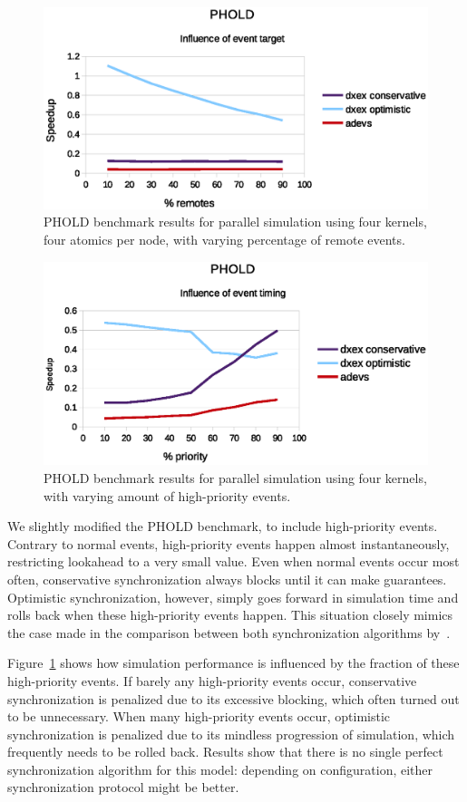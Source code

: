 \begin{figure}
    \center
    \includegraphics[width=\columnwidth]{fig/phold_remotes.eps}
    \caption{PHOLD benchmark results for parallel simulation using four kernels, four atomics per node, with varying percentage of remote events.}
\end{figure}
\begin{figure}
	\center
	\includegraphics[width=\columnwidth]{fig/phold_priority.eps}
	\caption{PHOLD benchmark results for parallel simulation using four kernels, with varying amount of high-priority events.}
	\label{fig:phold_priority}
\end{figure}

We slightly modified the PHOLD benchmark, to include high-priority events.
Contrary to normal events, high-priority events happen almost instantaneously, restricting lookahead to a very small value.
Even when normal events occur most often, conservative synchronization always blocks until it can make guarantees.
Optimistic synchronization, however, simply goes forward in simulation time and rolls back when these high-priority events happen.
This situation closely mimics the case made in the comparison between both synchronization algorithms by~\cite{FujimotoBook}.

Figure~\ref{fig:phold_priority} shows how simulation performance is influenced by the fraction of these high-priority events.
If barely any high-priority events occur, conservative synchronization is penalized due to its excessive blocking, which often turned out to be unnecessary.
When many high-priority events occur, optimistic synchronization is penalized due to its mindless progression of simulation, which frequently needs to be rolled back.
Results show that there is no single perfect synchronization algorithm for this model: depending on configuration, either synchronization protocol might be better.
